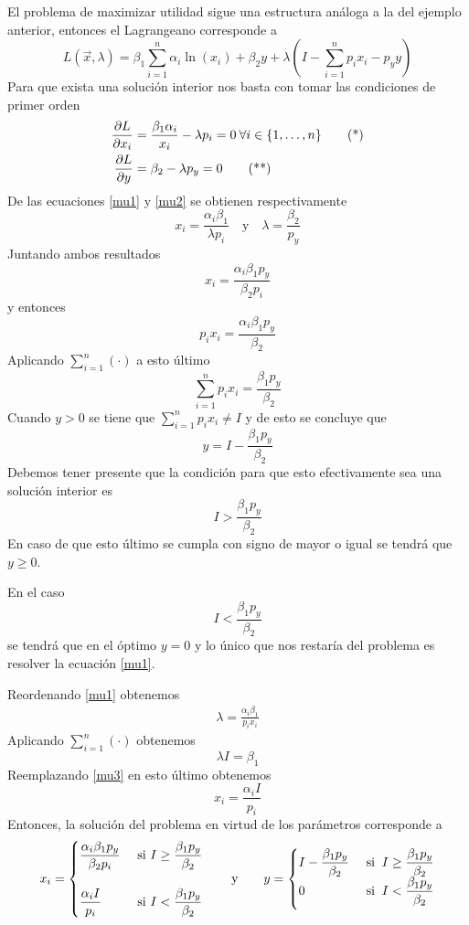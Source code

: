 \begin{ejemplo}
El problema de maximizar utilidad sigue una estructura an\'aloga a la del ejemplo anterior, entonces el Lagrangeano corresponde a
$$L(\vec{x},\lambda) = \beta_1 \sum_{i=1}^n  \alpha_i \ln (x_i) + \beta_2 y + \lambda \left(I-\sum_{i=1}^n p_i x_i - p_y y \right)  $$
Para que exista una soluci\'on interior nos basta con tomar las condiciones de primer orden
	\begin{align}
	\label{mu1} \frac{\partial L}{\partial x_i} & =  \frac{\beta_1 \alpha_i}{x_i} - \lambda p_i = 0 \: \forall i \in \{1,\ldots , n\} \tag{*} \\
	\label{mu2} \frac{\partial L}{\partial y} & = \beta_2 - \lambda p_y = 0 \tag{**} 
	\end{align}
De las ecuaciones \eqref{mu1} y \eqref{mu2} se obtienen respectivamente
$$x_i = \frac{\alpha_i \beta_1}{\lambda p_i} \quad \text{y} \quad \lambda = \frac{\beta_2}{p_y}$$
Juntando ambos resultados
$$x_i = \frac{\alpha_i \beta_1 p_y}{\beta_2 p_i}$$
y entonces
$$p_i x_i = \frac{\alpha_i \beta_1 p_y}{\beta_2}$$
Aplicando $\sum_{i=1}^n (\cdot)$ a esto \'ultimo
$$\sum_{i=1}^n p_i x_i  = \frac{\beta_1 p_y}{\beta_2} $$
Cuando $y>0$ se tiene que $\sum_{i=1}^n p_i x_i \neq I$ y de esto se concluye que
$$y = I-\frac{\beta_1 p_y}{\beta_2}$$
Debemos tener presente que la condici\'on para que esto efectivamente sea una soluci\'on interior es 
$$I > \frac{\beta_1 p_y}{\beta_2} $$
En caso de que esto \'ultimo se cumpla con signo de mayor o igual se tendr\'a que $y \geq 0$.

En el caso 
$$I < \frac{\beta_1 p_y}{\beta_2} $$ 
se tendr\'a que en el \'optimo $y = 0$ y lo \'unico que nos restar\'ia del problema es resolver la ecuaci\'on \eqref{mu1}.

Reordenando \eqref{mu1} obtenemos
	\begin{gather}
	\label{mu3} \lambda = \frac{\alpha_i \beta_1}{p_i x_i} \tag{***}
	\end{gather}
Aplicando $\sum_{i=1}^n (\cdot)$ obtenemos
$$\lambda I = \beta_1 $$
Reemplazando \eqref{mu3} en esto \'ultimo obtenemos
$$x_i  = \frac{\alpha_i I}{p_i}$$
Entonces, la soluci\'on del problema en virtud de los par\'ametros corresponde a
	\begin{align*}
	x_i =  
	\begin{cases}
	\displaystyle \frac{\alpha_i \beta_1 p_y}{\beta_2 p_i} 	 & \text{ si } I \geq \displaystyle \frac{\beta_1 p_y}{\beta_2} \cr
	\cr
	\displaystyle \frac{\alpha_i I}{p_i} 		 			 & \text{ si } I < \displaystyle \frac{\beta_1 p_y}{\beta_2}
	\end{cases} 
	\qquad \text{y} \qquad
	y  = 
	\begin{cases}
	I - \displaystyle \frac{\beta_1 p_y}{\beta_2} & \text{ si } \: I \geq \displaystyle \frac{\beta_1 p_y}{\beta_2} 
	\\ \smallskip
	0 											  & \text{ si } \: I < \displaystyle \frac{\beta_1 p_y}{\beta_2}
	\end{cases}
	\end{align*}


\end{ejemplo}
